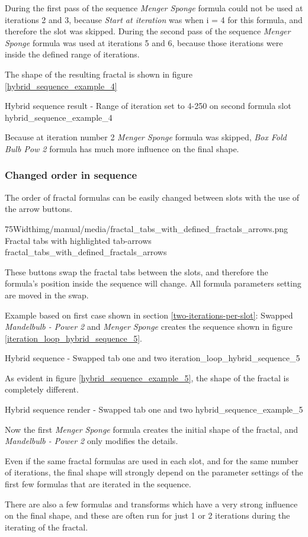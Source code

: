 During the first pass of the sequence \emph{Menger Sponge} formula could not be used at iterations 2 and 3,
because \emph{Start at iteration} was when i = 4 for this formula, and therefore the slot was skipped.
During the second pass of the sequence \emph{Menger Sponge} formula was used at iterations 5 and 6,
because those iterations were inside the defined range of iterations.

The shape of the resulting fractal is shown in figure \ref{hybrid_sequence_example_4}

{Hybrid sequence result - Range of iteration set to 4-250 on second formula slot}
{hybrid_sequence_example_4}

Because at iteration number 2 \emph{Menger Sponge} formula was skipped, \emph{Box Fold Bulb Pow 2} formula has much more influence on the final shape.

\subsubsection{Changed order in sequence}

The order of fractal formulas can be easily changed between slots with the use of the arrow buttons.

\simpleImageWithCaption75Width{img/manual/media/fractal_tabs_with_defined_fractals_arrows.png}
{Fractal tabs with highlighted tab-arrows}
{fractal_tabs_with_defined_fractals_arrows}

These buttons swap the fractal tabs between the slots, and therefore  the formula's position inside the sequence will change. All formula parameters setting are moved in the swap.

Example based on first case shown in section \ref{two-iterations-per-slot}:
Swapped \emph{Mandelbulb - Power 2} and \emph{Menger Sponge} creates the sequence shown in figure \ref{iteration_loop_hybrid_sequence_5}.

{Hybrid sequence - Swapped tab one and two}
{iteration_loop_hybrid_sequence_5}

As evident in figure \ref{hybrid_sequence_example_5}, the shape of the fractal is completely different.

{Hybrid sequence render - Swapped tab one and two}
{hybrid_sequence_example_5}

Now the first \emph{Menger Sponge} formula creates the initial shape of the fractal, and \emph{Mandelbulb - Power 2} only modifies the details.

Even if the same fractal formulas are used in each slot, and for the same number of iterations, the final shape will strongly depend on the parameter settings of the first few formulas that are iterated in the sequence.

There are also a few formulas and transforms which have a very strong influence on the final shape, and these are often run for just 1 or 2 iterations during the iterating of the fractal.

